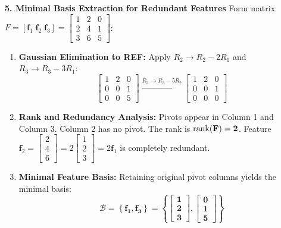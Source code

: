 \textbf{5. Minimal Basis Extraction for Redundant Features}
Form matrix $F = [\mathbf{f}_1 \; \mathbf{f}_2 \; \mathbf{f}_3] = \begin{bmatrix} 1 & 2 & 0 \\ 2 & 4 & 1 \\ 3 & 6 & 5 \end{bmatrix}$:
\begin{enumerate}
    \item \textbf{Gaussian Elimination to REF:}
    Apply $R_2 \to R_2 - 2R_1$ and $R_3 \to R_3 - 3R_1$:
    \begin{equation*}
    \begin{bmatrix} 1 & 2 & 0 \\ 0 & 0 & 1 \\ 0 & 0 & 5 \end{bmatrix} \xrightarrow{R_3 \to R_3 - 5R_2} \begin{bmatrix} 1 & 2 & 0 \\ 0 & 0 & 1 \\ 0 & 0 & 0 \end{bmatrix}
    \end{equation*}
    \item \textbf{Rank and Redundancy Analysis:}
    Pivots appear in Column 1 and Column 3. Column 2 has no pivot.
    The rank is $\mathbf{\operatorname{rank}(F) = 2}$.
    Feature $\mathbf{f}_2 = \begin{bmatrix} 2 \\ 4 \\ 6 \end{bmatrix} = 2 \begin{bmatrix} 1 \\ 2 \\ 3 \end{bmatrix} = 2\mathbf{f}_1$ is completely redundant.
    \item \textbf{Minimal Feature Basis:}
    Retaining original pivot columns yields the minimal basis:
    \begin{equation*}
    \mathcal{B} = \mathbf{\left\{ \mathbf{f}_1, \mathbf{f}_3 \right\} = \left\{ \begin{bmatrix} 1 \\ 2 \\ 3 \end{bmatrix}, \begin{bmatrix} 0 \\ 1 \\ 5 \end{bmatrix} \right\}}
    \end{equation*}
\end{enumerate}

